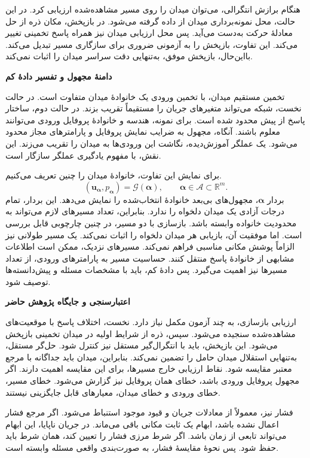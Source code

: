 هنگام برازش انتگرالی، می‌توان میدان را روی مسیر مشاهده‌شده ارزیابی کرد.
در این حالت، محل نمونه‌برداری میدان از داده گرفته می‌شود.
در بازپخش، مکان ذره از حل معادلهٔ حرکت به‌دست می‌آید.
پس محل ارزیابی میدان نیز همراه پاسخ تخمینی تغییر می‌کند.
این تفاوت، بازپخش را به آزمونی ضروری برای سازگاری مسیر تبدیل می‌کند.
بااین‌حال، بازپخش موفق، به‌تنهایی دقت سراسر میدان را اثبات نمی‌کند.

\textbf{دامنهٔ مجهول و تفسیر دادهٔ کم}

تخمین مستقیم میدان، با تخمین ورودی یک خانوادهٔ میدان متفاوت است.
در حالت نخست، شبکه می‌تواند متغیرهای جریان را مستقیماً تقریب بزند.
در حالت دوم، ساختار پاسخ از پیش محدود شده است.
برای نمونه، هندسه و خانوادهٔ پروفایل ورودی می‌توانند معلوم باشند.
آنگاه، مجهول به ضرایب نمایش پروفایل و پارامترهای مجاز محدود می‌شود.
یک عملگر آموزش‌دیده، نگاشت این ورودی‌ها به میدان را تقریب می‌زند.
این نقش، با مفهوم یادگیری عملگر سازگار است.
\cite{lu2021deeponet}

برای نمایش این تفاوت، خانوادهٔ میدان را چنین تعریف می‌کنیم.
\begin{equation}
(\mathbf u_{\boldsymbol\alpha},p_{\boldsymbol\alpha})
=\mathcal G(\boldsymbol\alpha),
\qquad
\boldsymbol\alpha\in\mathcal A\subset\mathbb R^{m}.
\label{eq:lit-timed-restricted-family}
\end{equation}
بردار $\boldsymbol\alpha$، مجهول‌های بی‌بعد خانوادهٔ انتخاب‌شده را نمایش می‌دهد.
این بردار، تمام درجات آزادی یک میدان دلخواه را ندارد.
بنابراین، تعداد مسیرهای لازم می‌تواند به محدودیت خانواده وابسته باشد.
بازسازی با دو مسیر، در چنین چارچوبی قابل بررسی است.
اما موفقیت آن، بازیابی هر میدان دلخواه را اثبات نمی‌کند.
یک مسیر طولانی نیز الزاماً پوشش مکانی مناسبی فراهم نمی‌کند.
مسیرهای نزدیک، ممکن است اطلاعات مشابهی از خانوادهٔ پاسخ منتقل کنند.
حساسیت مسیر به پارامترهای ورودی، از تعداد مسیرها نیز اهمیت می‌گیرد.
پس دادهٔ کم، باید با مشخصات مسئله و پیش‌دانسته‌ها توصیف شود.

\textbf{اعتبارسنجی و جایگاه پژوهش حاضر}

ارزیابی بازسازی، به چند آزمون مکمل نیاز دارد.
نخست، اختلاف پاسخ با موقعیت‌های مشاهده‌شده سنجیده می‌شود.
سپس، ذره از شرایط اولیه در میدان تخمینی بازپخش می‌شود.
این بازپخش، باید با انتگرال‌گیر مستقل نیز کنترل شود.
حل‌گر مستقل، به‌تنهایی استقلال میدان حامل را تضمین نمی‌کند.
بنابراین، میدان باید جداگانه با مرجع معتبر مقایسه شود.
نقاط ارزیابی خارج مسیرها، برای این مقایسه اهمیت دارند.
اگر مجهول پروفایل ورودی باشد، خطای همان پروفایل نیز گزارش می‌شود.
خطای مسیر، خطای ورودی و خطای میدان، معیارهای قابل جایگزینی نیستند.

فشار نیز، معمولاً از معادلات جریان و قیود موجود استنباط می‌شود.
اگر مرجع فشار اعمال نشده باشد، ابهام یک ثابت مکانی باقی می‌ماند.
در جریان ناپایا، این ابهام می‌تواند تابعی از زمان باشد.
اگر شرط مرزی فشار را تعیین کند، همان شرط باید حفظ شود.
پس نحوهٔ مقایسهٔ فشار، به صورت‌بندی واقعی مسئله وابسته است.

